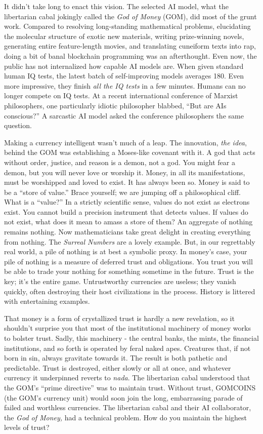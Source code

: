 It didn't take long to enact this vision. The selected AI model, what
the libertarian cabal jokingly called the \emph{God of Money} (GOM), did
most of the grunt work. Compared to resolving long-standing mathematical
problems, elucidating the molecular structure of exotic new materials,
writing prize-winning novels, generating entire feature-length movies,
and translating cuneiform texts into rap, doing a bit of banal
blockchain programming was an afterthought. Even now, the public has not
internalized how capable AI models are. When given standard human IQ
tests, the latest batch of self-improving models averages 180. Even more
impressive, they finish \emph{all the IQ tests} in a few minutes. Humans
can no longer compete on IQ tests. At a recent international conference
of Marxist philosophers, one particularly idiotic philosopher blabbed,
``But are AIs conscious?'' A sarcastic AI model asked the conference
philosophers the same question.

Making a currency intelligent wasn't much of a leap. The innovation,
\emph{the idea}, behind the GOM was establishing a Moses-like covenant
with it. A god that acts without order, justice, and reason is a demon,
not a god. You might fear a demon, but you will never love or worship
it. Money, in all its manifestations, must be worshipped and loved to
exist. It has always been so. Money is said to be a ``store of value.''
Brace yourself; we are jumping off a philosophical cliff. What is a
``value?'' In a strictly scientific sense, values do not exist as
electrons exist. You cannot build a precision instrument that detects
values. If values do not exist, what does it mean to amass a store of
them? An aggregate of nothing remains nothing. Now mathematicians take
great delight in creating everything from nothing. The \emph{Surreal
Numbers} are a lovely example. But, in our regrettably real world, a
pile of nothing is at best a symbolic proxy. In money's case, your pile
of nothing is a measure of deferred trust and obligations. You trust you
will be able to trade your nothing for something sometime in the future.
Trust is the key; it's the entire game. Untrustworthy currencies are
useless; they vanish quickly, often destroying their host civilizations
in the process. History is littered with entertaining examples.

That money is a form of crystallized trust is hardly a new revelation,
so it shouldn't surprise you that most of the institutional machinery of
money works to bolster trust. Sadly, this machinery - the central banks,
the mints, the financial institutions, and so forth is operated by feral
naked apes. Creatures that, if not born in sin, always gravitate towards
it. The result is both pathetic and predictable. Trust is destroyed,
either slowly or all at once, and whatever currency it underpinned
reverts to \emph{nada}. The libertarian cabal understood that the GOM's
``prime directive'' was to maintain trust. Without trust, GOMCOINS (the
GOM's currency unit) would soon join the long, embarrassing parade of
failed and worthless currencies. The libertarian cabal and their AI
collaborator, the \emph{God of Money,} had a technical problem. How do
you maintain the highest levels of trust?

